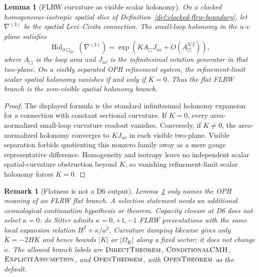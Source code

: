 \documentclass[11pt]{article}
\newtheorem{lemma}[theorem]{Lemma}
\newtheorem{remark}[theorem]{Remark}
\begin{document}
\begin{lemma}[FLRW curvature as visible scalar holonomy]\label{lem:flrw-curvature-holonomy}
On a clocked homogeneous-isotropic spatial slice of Definition~\ref{def:clocked-flrw-boundary},
let \(\nabla^{(3)}\) be the spatial Levi--Civita connection. The small-loop holonomy in the
\(u\)-\(v\) plane satisfies
\[
\operatorname{Hol}_{\partial\Box_{uv}}(\nabla^{(3)})
=
\exp\!\left(KA_\Box J_{uv}+O(A_\Box^{3/2})\right),
\]
where \(A_\Box\) is the loop area and \(J_{uv}\) is the infinitesimal rotation generator in that
two-plane. On a visibly separated OPH refinement system, the refinement-limit scalar spatial
holonomy vanishes if and only if \(K=0\). Thus the flat FLRW branch is the zero-visible spatial
holonomy branch.
\end{lemma}

\begin{proof}
The displayed formula is the standard infinitesimal holonomy expansion for a connection with
constant sectional curvature. If \(K=0\), every area-normalized small-loop curvature readout
vanishes. Conversely, if \(K\ne0\), the area-normalized holonomy converges to \(KJ_{uv}\) in each
visible two-plane. Visible separation forbids quotienting this nonzero family away as a mere gauge
representative difference. Homogeneity and isotropy leave no independent scalar spatial-curvature
obstruction beyond \(K\), so vanishing refinement-limit scalar holonomy forces \(K=0\).
\end{proof}

\begin{remark}[Flatness is not a D6 output]\label{rem:flrw-holonomy-boundary}
Lemma~\ref{lem:flrw-curvature-holonomy} only names the OPH meaning of an FLRW flat branch. A
selection statement needs an additional cosmological continuation hypothesis or theorem. Capacity
closure at D6 does not select \(\kappa=0\): de Sitter admits \(\kappa=0,+1,-1\) FLRW presentations
with the same local expansion relation \(H^2+\kappa/a^2\). Curvature damping likewise gives only
\(\dot K=-2HK\) and hence bounds \(|K|\) or \(|\Omega_K|\) along a fixed sector; it does not change
\(\kappa\). The allowed branch labels are
\(\textsc{DirectTheorem}\), \(\textsc{ConditionalCMH}\), \(\textsc{ExplicitAssumption}\), and
\(\textsc{OpenTheorem}\), with \(\textsc{OpenTheorem}\) as the default.
\end{remark}
\end{document}
